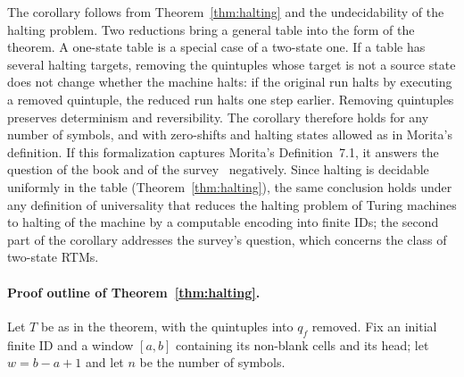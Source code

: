 \documentclass{article}
\theoremstyle{definition}
\theoremstyle{remark}
\begin{document}
The corollary follows from Theorem~\ref{thm:halting} and the undecidability of the halting problem.
Two reductions bring a general table into the form of the theorem.
A one-state table is a special case of a two-state one.
If a table has several halting targets, removing the quintuples whose target is not a source state does not change whether the machine halts: if the original run halts by executing a removed quintuple, the reduced run halts one step earlier.
Removing quintuples preserves determinism and reversibility.
The corollary therefore holds for any number of symbols, and with zero-shifts and halting states allowed as in Morita's definition.
If this formalization captures Morita's Definition~7.1, it answers the question of the book and of the survey~\cite{Morita23} negatively. Since halting is decidable uniformly in the table (Theorem~\ref{thm:halting}), the same conclusion holds under any definition of universality that reduces the halting problem of Turing machines to halting of the machine by a computable encoding into finite IDs; the second part of the corollary addresses the survey's question, which concerns the class of two-state RTMs.

\paragraph{Proof outline of Theorem~\ref{thm:halting}.}
Let $T$ be as in the theorem, with the quintuples into $q_f$ removed.
Fix an initial finite ID and a window $[a,b]$ containing its non-blank cells and its head; let $w=b-a+1$ and let $n$ be the number of symbols.
\end{document}
